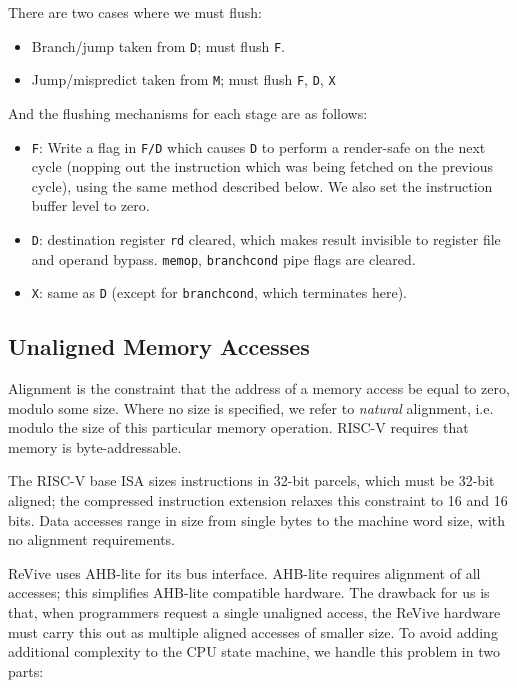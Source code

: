 \documentclass{article}
\begin{document}
There are two cases where we must flush:

\begin{itemize}
	\item Branch/jump taken from \texttt{D}; must flush \texttt{F}.
	\item Jump/mispredict taken from \texttt{M}; must flush \texttt{F}, \texttt{D}, \texttt{X}
\end{itemize}

And the flushing mechanisms for each stage are as follows:
\begin{itemize}
	\item \texttt{F}: Write a flag in \texttt{F/D} which causes \texttt{D} to perform a render-safe on the next cycle (nopping out the instruction which was being fetched on the previous cycle), using the same method described below. We also set the instruction buffer level to zero.
	\item \texttt{D}: destination register \texttt{rd} cleared, which makes result invisible to register file and operand bypass. \texttt{memop}, \texttt{branchcond} pipe flags are cleared.
	\item \texttt{X}: same as \texttt{D} (except for \texttt{branchcond}, which terminates here).
\end{itemize}

\subsection{Unaligned Memory Accesses}

Alignment is the constraint that the address of a memory access be equal to zero, modulo some size. Where no size is specified, we refer to \textit{natural} alignment, i.e. modulo the size of this particular memory operation. RISC-V requires that memory is byte-addressable.

The RISC-V base ISA sizes instructions in 32-bit parcels, which must be 32-bit aligned; the compressed instruction extension relaxes this constraint to 16 and 16 bits. Data accesses range in size from single bytes to the machine word size, with no alignment requirements. 

ReVive uses AHB-lite for its bus interface. AHB-lite requires alignment of all accesses; this simplifies AHB-lite compatible hardware. The drawback for us is that, when programmers request a single unaligned access, the ReVive hardware must carry this out as multiple aligned accesses of smaller size. To avoid adding additional complexity to the CPU state machine, we handle this problem in two parts:
\end{document}
